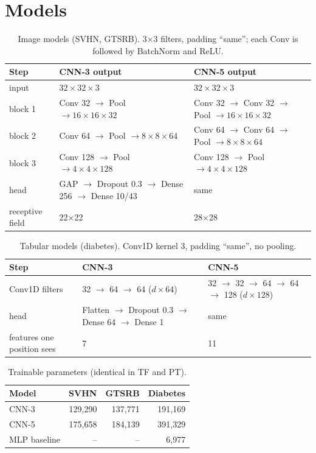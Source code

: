 \documentclass[11pt, a4paper]{article}
\begin{document}
\section{Models}

\begin{table}[H]
\centering
\caption{Image models (SVHN, GTSRB). 3$\times$3 filters, padding ``same''; each Conv is followed by BatchNorm and ReLU.}
\footnotesize
\setlength{\tabcolsep}{4pt}\begin{tabular}{lll}
\toprule
Step & CNN-3 output & CNN-5 output \\
\midrule
input & $32\times32\times3$ & $32\times32\times3$ \\
block 1 & Conv 32 $\to$ Pool $\to 16\times16\times32$ & Conv 32 $\to$ Conv 32 $\to$ Pool $\to 16\times16\times32$ \\
block 2 & Conv 64 $\to$ Pool $\to 8\times8\times64$ & Conv 64 $\to$ Conv 64 $\to$ Pool $\to 8\times8\times64$ \\
block 3 & Conv 128 $\to$ Pool $\to 4\times4\times128$ & Conv 128 $\to$ Pool $\to 4\times4\times128$ \\
head & GAP $\to$ Dropout 0.3 $\to$ Dense 256 $\to$ Dense 10/43 & same \\
receptive field & 22$\times$22 & 28$\times$28 \\
\bottomrule
\end{tabular}
\end{table}

\begin{table}[H]
\centering
\caption{Tabular models (diabetes). Conv1D kernel 3, padding ``same'', no pooling.}
\footnotesize
\setlength{\tabcolsep}{4pt}\begin{tabular}{lll}
\toprule
Step & CNN-3 & CNN-5 \\
\midrule
Conv1D filters & 32 $\to$ 64 $\to$ 64 ($d\times64$) & 32 $\to$ 32 $\to$ 64 $\to$ 64 $\to$ 128 ($d\times128$) \\
head & Flatten $\to$ Dropout 0.3 $\to$ Dense 64 $\to$ Dense 1 & same \\
features one position sees & 7 & 11 \\
\bottomrule
\end{tabular}
\end{table}

\begin{table}[H]
\centering
\caption{Trainable parameters (identical in TF and PT).}
\small
\begin{tabular}{lrrr}
\toprule
Model & SVHN & GTSRB & Diabetes \\
\midrule
CNN-3 & 129,290 & 137,771 & 191,169 \\
CNN-5 & 175,658 & 184,139 & 391,329 \\
MLP baseline & -- & -- & 6,977 \\
\bottomrule
\end{tabular}
\end{table}
\end{document}
